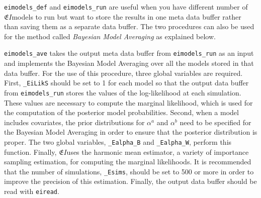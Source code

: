 \documentclass[11pt,titlepage]{article}
\newcommand{\EI}{\ensuremath{{\mathfrak EI}}}
\begin{document}
\texttt{eimodels\_def} and \texttt{eimodels\_run} are useful when you
have different number of \EI models to run but want to store the
results in one meta data buffer rather than saving them as a separate
data buffer. The two procedures can also be used for the method called
\textit{Bayesian Model Averaging} as explained below.

\texttt{eimodels\_ave} takes the output meta data buffer from
\texttt{eimodels\_run} as an input and implements the Bayesian Model
Averaging over all the models stored in that data buffer. For the use
of this procedure, three global variables are required. First,
\texttt{\_EiLikS} should be set to 1 for each model so that the output
data buffer from \texttt{eimodels\_run} stores the values of the
log-likelihood at each simulation. These values are necessary to
compute the marginal likelihood, which is used for the computation of
the posterior model probabilities. Second, when a model includes
covariates, the prior distributions for $\alpha^a$ and $\alpha^b$ need
to be specified for the Bayesian Model Averaging in order to ensure
that the posterior distribution is proper. The two global variables,
\texttt{\_Ealpha\_B} and \texttt{\_Ealpha\_W}, perform this function.
Finally, \EI uses the harmonic mean estimator, a variety of importance
sampling estimation, for computing the marginal likelihoods. It is
recommended that the number of simulations, \texttt{\_Esims}, should
be set to 500 or more in order to improve the precision of this
estimation.  Finally, the output data buffer should be read with
\texttt{eiread}.
\end{document}
